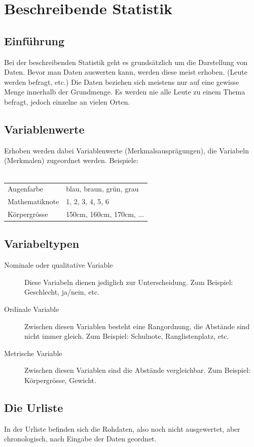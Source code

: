 \documentclass[12pt,a4paper]{scrbook}
\begin{document}
\chapter{Beschreibende Statistik}
\section{Einführung}
Bei der beschreibenden Statistik geht es grundsätzlich um die Darstellung von Daten.
Bevor man Daten auswerten kann, werden diese meist erhoben. (Leute werden befragt, etc.)
Die Daten beziehen sich meistens nur auf eine gewisse Menge innerhalb der Grundmenge.
Es werden nie alle Leute zu einem Thema befragt, jedoch einzelne an vielen Orten.

\section{Variablenwerte}
Erhoben werden dabei Variablenwerte (Merkmalsausprägungen), die Variabeln (Merkmalen) zugeordnet werden.
Beispiele:\\\\
\begin{tabular}{|ll|}
Augenfarbe & blau, braun,  grün, grau\\
Mathematiknote & 1, 2, 3, 4, 5, 6\\
Körpergrösse & 150cm, 160cm, 170cm, ...
\end{tabular}

\section{Variabeltypen}
\begin{description}
  \item[Nominale oder qualitative Variable] Diese Variabeln dienen jediglich zur Unterscheidung. Zum Beispiel: Geschlecht, ja/nein, etc.
  \item[Ordinale Variable] Zwischen diesen Variablen besteht eine Rangordnung, die Abstände sind nicht immer gleich. Zum Beispiel: Schulnote, Ranglistenplatz, etc.
  \item[Metrische Variable] Zwischen diesen Variablen sind die Abstände vergleichbar. Zum Beispiel: Körpergrösse, Gewicht.
\end{description}

\section{Die Urliste}
In der Urliste befinden sich die Rohdaten, also noch nicht ausgewertet, aber chronologisch, nach Eingabe der Daten geordnet.
\end{document}
